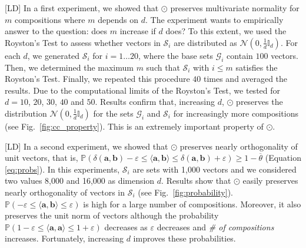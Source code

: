 \documentclass[twoside,11pt]{article}
\def\vec#1{\mathbf{#1}}
\def\smallvectors#1{\mathcal{#1}}
\def\P{\mathbb{P}}
\def\dotprod#1#2{\langle#1,#2\rangle}
\def\mo{\odot}
\def\LD#1{[{\color{blue}L}D] {\color{blue}#1}}
\begin{document}
\LD{In a first experiment, we showed that $\mo$ preserves multivariate normality for $m$ compositions where $m$ depends on $d$.} The experiment wants to empirically answer to the question: does $m$ increase if $d$ does? To this extent, we used the Royston's Test \cite{10.2307/2347291} to assess whether vectors in $\smallvectors{S}_i$ are distributed as  $\mathcal{N}(0,\frac{1}{d}\mathbb{I}_d)$. 
For each $d$, we generated 
$\smallvectors{S}_i$ for $i=1 \ldots 20$, where the base sets $\smallvectors{G}_i$ contain $100$ vectors. Then, we determined the maximum $m$ such that  $\smallvectors{S}_i$ with $i \leq m$ satisfies the Royston's Test. Finally, we repeated this procedure $40$ times and averaged the results.
Due to the computational limits of the Royston's Test, we tested for $d=10$, $20$, $30$, $40$ and $50$. Results confirm that, increasing $d$, $\mo$ preserves the distribution $\mathcal{N}(0,\frac{1}{d}\mathbb{I}_d)$ for the sets  $\smallvectors{G}_i$  and  $\smallvectors{S}_i$  for increasingly more compositions (see Fig.~\ref{fig:cc_property}). This is an extremely important property of $\mo$.


\LD{In a second experiment, we showed that $\mo$ preserves nearly orthogonality of unit vectors, that is,  $\P(\delta(\vec{a},\vec{b}) - \varepsilon \leq \dotprod{\vec{a}}{\vec{b}} \leq \delta(\vec{a},\vec{b}) + \varepsilon) \geq 1- \overline{\theta}$  (Equation \ref{eq:probs}).} In this experiments,  $\smallvectors{S}_{i}$ are sets with 1,000 vectors and we considered  two values 8,000 and 16,000 as dimension $d$. Results show that $\mo$ easily preserves nearly orthogonality of vectors in $\smallvectors{S}_{i}$ (see Fig.~\ref{fig:probability}). $\P(- \varepsilon \leq \dotprod{\vec{a}}{\vec{b}} \leq \varepsilon) $ is high for a large number of compositions. Moreover, it also preserves the unit norm of vectors although the probability $\P(1 - \varepsilon \leq \dotprod{\vec{a}}{\vec{a}} \leq 1+\varepsilon) $ decreases as $\varepsilon$ decreases and \emph{\# of compositions} increases. Fortunately, increasing $d$ improves these probabilities.
\end{document}
